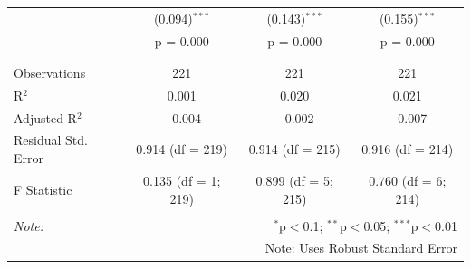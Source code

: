 \documentclass[
]{article}
\begin{document}
\begin{table}[!htbp]
\begin{tabular}{@{\extracolsep{3pt}}lccc}
  & (0.094)$^{***}$ & (0.143)$^{***}$ & (0.155)$^{***}$ \\ 
  & p = 0.000 & p = 0.000 & p = 0.000 \\ 
  & & & \\ 
\hline \\[-1.8ex] 
Observations & 221 & 221 & 221 \\ 
R$^{2}$ & 0.001 & 0.020 & 0.021 \\ 
Adjusted R$^{2}$ & $-$0.004 & $-$0.002 & $-$0.007 \\ 
Residual Std. Error & 0.914 (df = 219) & 0.914 (df = 215) & 0.916 (df = 214) \\ 
F Statistic & 0.135 (df = 1; 219) & 0.899 (df = 5; 215) & 0.760 (df = 6; 214) \\ 
\hline 
\hline \\[-1.8ex] 
\textit{Note:}  & \multicolumn{3}{r}{$^{*}$p$<$0.1; $^{**}$p$<$0.05; $^{***}$p$<$0.01} \\ 
 & \multicolumn{3}{r}{Note: Uses Robust Standard Error} \\ 
\end{tabular} 
\end{table}

\clearpage
\end{document}
